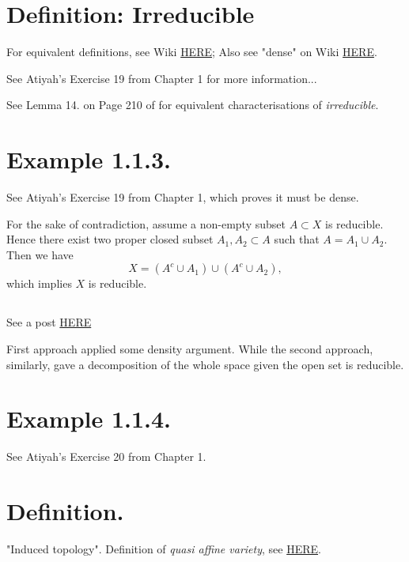 
\section{Definition: Irreducible}

For equivalent definitions, see Wiki \href{https://en.wikipedia.org/wiki/Irreducible_component}{HERE};
Also see "dense" on Wiki \href{https://en.wikipedia.org/wiki/Dense_set}{HERE}.

See Atiyah's \cite{atiyah1994introduction} Exercise 19 from Chapter 1 for more information...

See Lemma 14. on Page 210 of \cite{bosch2013algebraic} for equivalent characterisations of \textit{irreducible}.

\section{Example 1.1.3.}
See Atiyah's \cite{atiyah1994introduction} Exercise 19 from Chapter 1, which proves it must be dense.

For the sake of contradiction, assume a non-empty subset $A\subset X$ is reducible. Hence there exist two proper closed subset $A_1,A_2\subset A$ such that $A=A_1\cup A_2$.
Then we have $$X=(A^c\cup A_1)\cup (A^c\cup A_2),$$ which implies $X$ is reducible. 
\subsection{}
See a post \href{https://math.stackexchange.com/questions/460074/an-open-subset-of-an-irreducible-set-is-dense}{HERE} 

First approach applied some density argument. While the second approach, similarly, gave a decomposition of the whole space given the open set is reducible.

\section{Example 1.1.4.}

See Atiyah's \cite{atiyah1994introduction} Exercise 20 from Chapter 1.

\section{Definition.} 
"Induced topology". Definition of \textit{quasi affine variety}, see \href{https://math.stackexchange.com/questions/1086839/a-confusion-regarding-the-definition-of-a-quasi-affine-variety}{HERE}.

